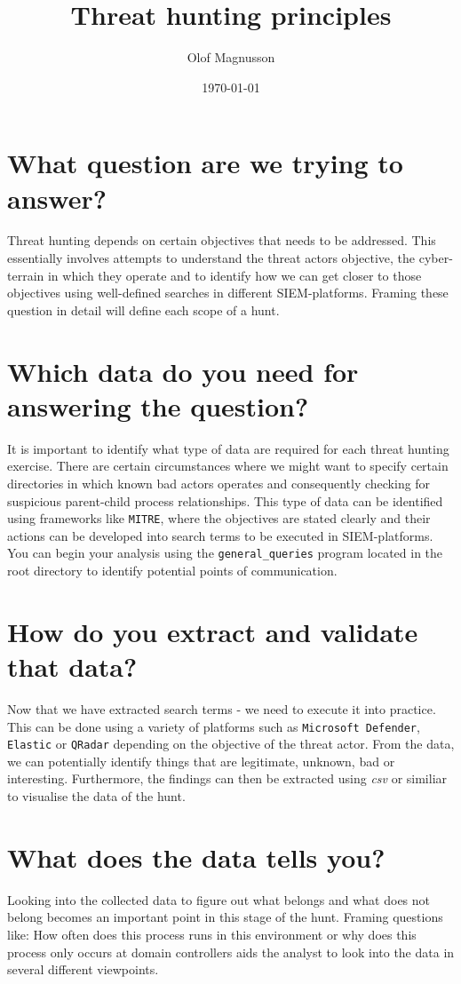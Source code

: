 \documentclass{article}
\title{Threat hunting principles \\
}
\author{Olof Magnusson}
\date{\today}
\begin{document}
	
	\maketitle
	
	\section*{What question are we trying to answer?}
Threat hunting depends on certain objectives that needs to be addressed. This essentially involves attempts to understand the threat actors objective, the cyber-terrain in which they operate and to identify how we can get closer to those objectives using well-defined searches in different SIEM-platforms. Framing these question in detail will define each scope of a hunt. 



	\section*{Which data do you need for answering the question?}
	It is important to identify what type of data are required for each threat hunting exercise. There are certain circumstances where we might want to specify certain directories in which known bad actors operates and consequently checking for suspicious parent-child process relationships. This type of data can be identified using frameworks like \texttt{MITRE}, where the objectives are stated clearly and their actions can be developed into search terms to be executed in SIEM-platforms. You can begin your analysis using the \texttt{general\_queries} program located in the root directory to identify potential points of communication.
    
	\section*{How do you extract and validate that data?}
	Now that we have extracted search terms - we need to execute it into practice. This can be done using a variety of platforms such as \texttt{Microsoft Defender}, \texttt{Elastic} or \texttt{QRadar} depending on the objective of the threat actor. From the data, we can potentially identify things that are legitimate, unknown, bad or interesting. Furthermore, the findings can then be extracted using \textit{csv} or similiar to visualise the data of the hunt.
	\section*{What does the data tells you?}
	Looking into the collected data to figure out what belongs and what does not belong becomes an important point in this stage of the hunt. Framing questions like: How often does this process runs in this environment or why does this process only occurs at domain controllers aids the analyst to look into the data in several different viewpoints.
	
\end{document}
